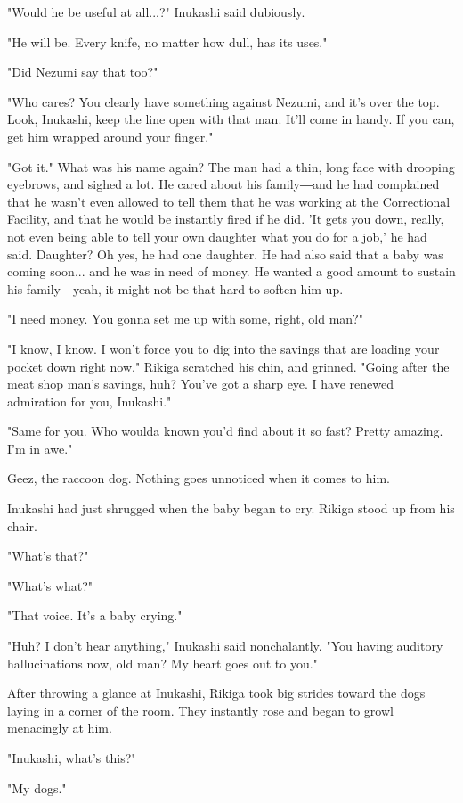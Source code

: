 "Would he be useful at all...?" Inukashi said dubiously.

"He will be. Every knife, no matter how dull, has its uses."

"Did Nezumi say that too?"

"Who cares? You clearly have something against Nezumi, and it's over the
top. Look, Inukashi, keep the line open with that man. It'll come in
handy. If you can, get him wrapped around your finger."

"Got it." What was his name again? The man had a thin, long face with
drooping eyebrows, and sighed a lot. He cared about his family―and he
had complained that he wasn't even allowed to tell them that he was
working at the Correctional Facility, and that he would be instantly
fired if he did. 'It gets you down, really, not even being able to tell
your own daughter what you do for a job,' he had said. Daughter? Oh yes,
he had one daughter. He had also said that a baby was coming soon... and
he was in need of money. He wanted a good amount to sustain his
family―yeah, it might not be that hard to soften him up.

"I need money. You gonna set me up with some, right, old man?"

"I know, I know. I won't force you to dig into the savings that are
loading your pocket down right now." Rikiga scratched his chin, and
grinned. "Going after the meat shop man's savings, huh? You've got a
sharp eye. I have renewed admiration for you, Inukashi."

"Same for you. Who woulda known you'd find about it so fast? Pretty
amazing. I'm in awe."

Geez, the raccoon dog. Nothing goes unnoticed when it comes to him.

Inukashi had just shrugged when the baby began to cry. Rikiga stood up
from his chair.

"What's that?"

"What's what?"

"That voice. It's a baby crying."

"Huh? I don't hear anything," Inukashi said nonchalantly. "You having
auditory hallucinations now, old man? My heart goes out to you."

After throwing a glance at Inukashi, Rikiga took big strides toward the
dogs laying in a corner of the room. They instantly rose and began to
growl menacingly at him.

"Inukashi, what's this?"

"My dogs."

